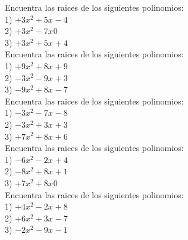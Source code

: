 \documentclass[a4paper,12pt]{article}
\begin{document}
 \pagebreak 
Encuentra las raices de los siguientes polinomios: \vspace{1cm}\\ 
1) $ +3x^{2}+5x^{}-4$ \vspace{3cm}\\ 
2) $ +3x^{2}-7x^{}0$ \vspace{3cm}\\ 
3) $ +3x^{2}+5x^{}+4$ \vspace{3cm}\\ 

 \pagebreak 
Encuentra las raices de los siguientes polinomios: \vspace{1cm}\\ 
1) $ +9x^{2}+8x^{}+9$ \vspace{3cm}\\ 
2) $ -3x^{2}-9x^{}+3$ \vspace{3cm}\\ 
3) $ -9x^{2}+8x^{}-7$ \vspace{3cm}\\ 

 \pagebreak 
Encuentra las raices de los siguientes polinomios: \vspace{1cm}\\ 
1) $ -3x^{2}-7x^{}-8$ \vspace{3cm}\\ 
2) $ -3x^{2}+3x^{}+3$ \vspace{3cm}\\ 
3) $ +7x^{2}+8x^{}+6$ \vspace{3cm}\\ 

 \pagebreak 
Encuentra las raices de los siguientes polinomios: \vspace{1cm}\\ 
1) $ -6x^{2}-2x^{}+4$ \vspace{3cm}\\ 
2) $ -8x^{2}+8x^{}+1$ \vspace{3cm}\\ 
3) $ +7x^{2}+8x^{}0$ \vspace{3cm}\\ 

 \pagebreak 
Encuentra las raices de los siguientes polinomios: \vspace{1cm}\\ 
1) $ +4x^{2}-2x^{}+8$ \vspace{3cm}\\ 
2) $ +6x^{2}+3x^{}-7$ \vspace{3cm}\\ 
3) $ -2x^{2}-9x^{}-1$ \vspace{3cm}\\ 

 \pagebreak 
\end{document}

